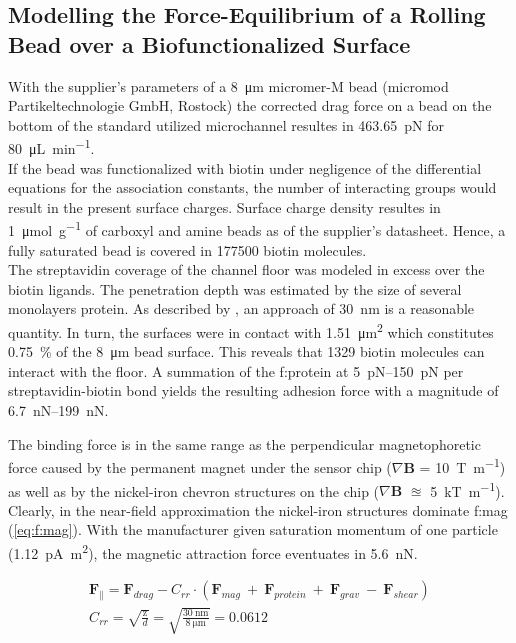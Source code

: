 \subsection{Modelling the Force-Equilibrium of a Rolling Bead over a Biofunctionalized Surface}
With the supplier's parameters of a \SI{8}{\micro\meter} micromer-M bead (micromod Partikeltechnologie GmbH, Rostock) the corrected drag force on a bead on the bottom of the standard utilized microchannel resultes in \SI{463.65}{\pico\newton} for \SI{80}{\micro\liter\per\minute}.\\
If the bead was functionalized with biotin under negligence of the differential equations for the association constants, the number of interacting groups would result in the present surface charges. Surface charge density resultes in \SI{1}{\micro\mole\per\gram} of \gls{carboxyl} and \gls{amine} beads as of the supplier's datasheet. Hence, a fully saturated bead is covered in \num{177500} biotin molecules.\\
The streptavidin coverage of the channel floor was modeled in excess over the biotin ligands. The penetration depth was estimated by the size of several monolayers protein. As described by \citet{lit:fluidic:ModelMIT}, an approach of \SI{30}{\nano\meter} is a reasonable quantity. In turn, the surfaces were in contact with \SI{1.51}{\micro\meter\squared} which constitutes \SI{0.75}{\percent} of the \SI{8}{\micro\meter} bead surface. This reveals that \num{1329} biotin molecules can interact with the floor. A summation of the \gls{f:protein} at \SIrange{5}{150}{\pico\newton} per streptavidin-biotin bond yields the resulting adhesion force with a magnitude of \SIrange{6.7}{199}{\nano\newton}.\cite{lit:bio:biotin:rupture} 

The binding force is in the same range as the perpendicular magnetophoretic force caused by the permanent magnet under the sensor chip ($\nabla \mathbf{B}$ = \SI{10}{\tesla\per\meter}) as well as by the nickel-iron chevron structures on the chip ($\nabla \mathbf{B}$ $\approxeq$ \SI{5}{\kilo\tesla\per\meter}). Clearly, in the near-field approximation the nickel-iron structures dominate \gls{f:mag} (\cref{eq:f:mag}). With the manufacturer given saturation momentum of one particle (\SI{1.12}{\pico\ampere\meter\squared}), the magnetic attraction force eventuates in \SI{5.6}{\nano\newton}.

\begin{align}
	\mathbf{F}_\parallel = \mathbf{F}_{drag} - C_{rr} \cdot (\mathbf{F}_{mag} \ +\ \mathbf{F}_{protein}  \ +\ \mathbf{F}_{grav}\ -\ \mathbf{F}_{shear} ) \label{eq:f:balance} \\
	C_{rr} = \sqrt{\frac{\text{z}}{d}} = \sqrt{\frac{\SI{30}{\nano\meter}}{\SI{8}{\micro\meter}}} = 0.0612 \label{eq:corr:roll}
\end{align}

